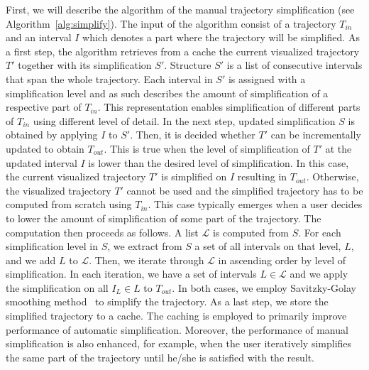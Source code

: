 First, we will describe the algorithm of the manual trajectory simplification (see Algorithm~\ref{alg:simplify}).
The input of the algorithm consist of a trajectory $T_{in}$ and an interval $I$ which denotes a part where the trajectory will be simplified.
As a first step, the algorithm retrieves from a cache the current visualized trajectory $T'$ together with its simplification $S'$.
Structure $S'$ is a list of consecutive intervals that span the whole trajectory.
Each interval in $S'$ is assigned with a simplification level and as such describes the amount of simplification of a respective part of $T_{in}$.
This representation enables simplification of different parts of $T_{in}$ using different level of detail.
In the next step, updated simplification $S$ is obtained by applying $I$ to $S'$.
Then, it is decided whether $T'$ can be incrementally updated to obtain $T_{out}$.
This is true when the level of simplification of $T'$ at the updated interval $I$ is lower than the desired level of simplification.
In this case, the current visualized trajectory $T'$ is simplified on $I$ resulting in $T_{out}$.
Otherwise, the visualized trajectory $T'$ cannot be used and the simplified trajectory has to be computed from scratch using $T_{in}$.
This case typically emerges when a user decides to lower the amount of simplification of some part of the trajectory.
The computation then proceeds as follows.
A list $\mathcal{L}$ is computed from $S$.
For each simplification level in $S$, we extract from $S$ a set of all intervals on that level, $L$, and we add $L$ to $\mathcal{L}$.
Then, we iterate through $\mathcal{L}$ in ascending order by level of simplification.
In each iteration, we have a set of intervals $L \in \mathcal{L}$ and we apply the simplification on all $I_L \in L$ to $T_{out}$.
In both cases, we employ Savitzky-Golay smoothing method~\cite{savitzky1964smoothing} to simplify the trajectory.
As a last step, we store the simplified trajectory to a cache.
The caching is employed to primarily improve performance of automatic simplification.
Moreover, the performance of manual simplification is also enhanced, for example, when the user iteratively simplifies the same part of the trajectory until he/she is satisfied with the result.

